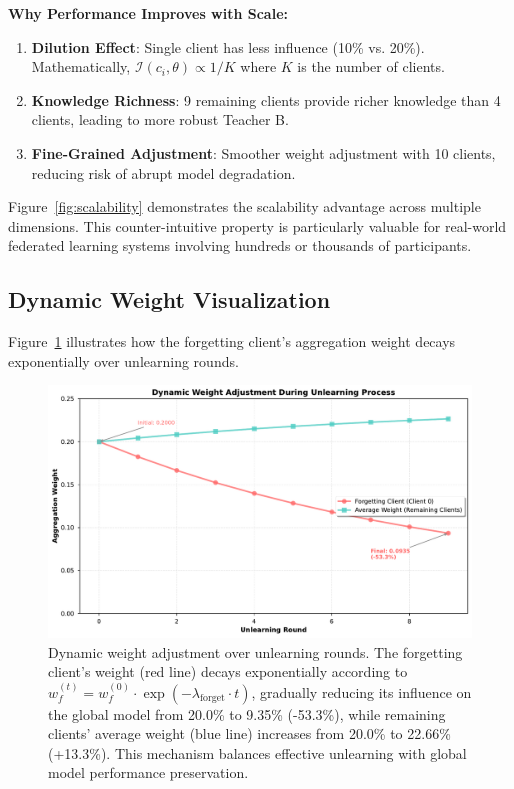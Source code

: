 \documentclass[10pt,twocolumn]{article}
\begin{document}
\textbf{Why Performance Improves with Scale:}

\begin{enumerate}
\item \textbf{Dilution Effect}: Single client has less influence (10\% vs. 20\%). Mathematically, $\mathcal{I}(c_i, \theta) \propto 1/K$ where $K$ is the number of clients.
\item \textbf{Knowledge Richness}: 9 remaining clients provide richer knowledge than 4 clients, leading to more robust Teacher B.
\item \textbf{Fine-Grained Adjustment}: Smoother weight adjustment with 10 clients, reducing risk of abrupt model degradation.
\end{enumerate}

Figure~\ref{fig:scalability} demonstrates the scalability advantage across multiple dimensions. This counter-intuitive property is particularly valuable for real-world federated learning systems involving hundreds or thousands of participants.

\subsection{Dynamic Weight Visualization}

Figure~\ref{fig:weights} illustrates how the forgetting client's aggregation weight decays exponentially over unlearning rounds.

\begin{figure}[htbp]
\centering
\includegraphics[width=\columnwidth]{figures/figure4_dynamic_weights.pdf}
\caption{Dynamic weight adjustment over unlearning rounds. The forgetting client's weight (red line) decays exponentially according to $w_f^{(t)} = w_f^{(0)} \cdot \exp(-\lambda_{\text{forget}} \cdot t)$, gradually reducing its influence on the global model from 20.0\% to 9.35\% (-53.3\%), while remaining clients' average weight (blue line) increases from 20.0\% to 22.66\% (+13.3\%). This mechanism balances effective unlearning with global model performance preservation.}
\label{fig:weights}
\end{figure}
\end{document}
